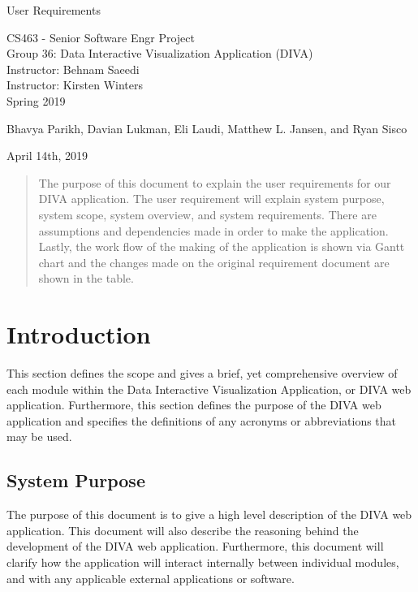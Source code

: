\documentclass[journal,10pt,onecolumn,compsoc]{IEEEtran} \usepackage[margin=1.0in]{geometry} \usepackage{pdfpages}
\begin{document}
\begin{center}
  
  \textbf{}

  \vspace{4cm}
  \Huge{}
  User Requirements
  \vspace{1.5cm}

 
  \LARGE
  CS463 - Senior Software Engr Project\\
  \vspace{0.25cm}
  Group 36: Data Interactive Visualization Application (DIVA)\\
  Instructor: Behnam Saeedi \\
  Instructor: Kirsten Winters \\
  \vspace{0.25cm}
  Spring 2019 \\
  \vspace{1.5cm}
  
  \large{Bhavya Parikh, Davian Lukman, Eli Laudi, Matthew L. Jansen, and Ryan Sisco}\\
  \date{April 14th, 2019}
  \vfill
  April 14th, 2019\\
  \vspace{1cm}
  \vspace*{\fill}
   \begin{abstract}
      The purpose of this document to explain the user requirements for our DIVA application. The user requirement will explain system purpose, system scope, system overview, and system requirements. There are assumptions and dependencies made in order to make the application. Lastly, the work flow of the making of the application is shown via Gantt chart and the changes made on the original requirement document are shown in the table.
       \noindent 
   \end{abstract}
   \normalsize 
  \end{center}
\newpage
\tableofcontents
\newpage
  
\section{Introduction}
\noindent This section defines the scope and gives a brief, yet comprehensive overview of each module within the Data Interactive Visualization Application, or DIVA web application. Furthermore, this section defines the purpose of the DIVA web application and specifies the definitions of any acronyms or abbreviations that may be used.

    \subsection{System Purpose}
    \noindent The purpose of this document is to give a high level description of the DIVA web application. This document will also describe the reasoning behind the development of the DIVA web application. Furthermore, this document will clarify how the application will interact internally between individual modules, and with any applicable external applications or software. 
\end{document}
